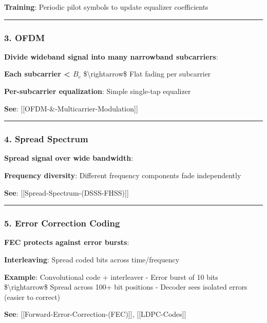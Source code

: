\textbf{Training}: Periodic pilot symbols to update equalizer
coefficients

\begin{center}\rule{0.5\linewidth}{0.5pt}\end{center}

\subsubsection{3. OFDM}\label{ofdm}

\textbf{Divide wideband signal into many narrowband subcarriers}:

\textbf{Each subcarrier \textless{} \(B_c\)}
\$\textbackslash rightarrow\$ Flat fading per subcarrier

\textbf{Per-subcarrier equalization}: Simple single-tap equalizer

\textbf{See}: {[}{[}OFDM-\&-Multicarrier-Modulation{]}{]}

\begin{center}\rule{0.5\linewidth}{0.5pt}\end{center}

\subsubsection{4. Spread Spectrum}\label{spread-spectrum}

\textbf{Spread signal over wide bandwidth}:

\textbf{Frequency diversity}: Different frequency components fade
independently

\textbf{See}: {[}{[}Spread-Spectrum-(DSSS-FHSS){]}{]}

\begin{center}\rule{0.5\linewidth}{0.5pt}\end{center}

\subsubsection{5. Error Correction
Coding}\label{error-correction-coding}

\textbf{FEC protects against error bursts}:

\textbf{Interleaving}: Spread coded bits across time/frequency

\textbf{Example}: Convolutional code + interleaver - Error burst of 10
bits \$\textbackslash rightarrow\$ Spread across 100+ bit positions -
Decoder sees isolated errors (easier to correct)

\textbf{See}: {[}{[}Forward-Error-Correction-(FEC){]}{]},
{[}{[}LDPC-Codes{]}{]}

